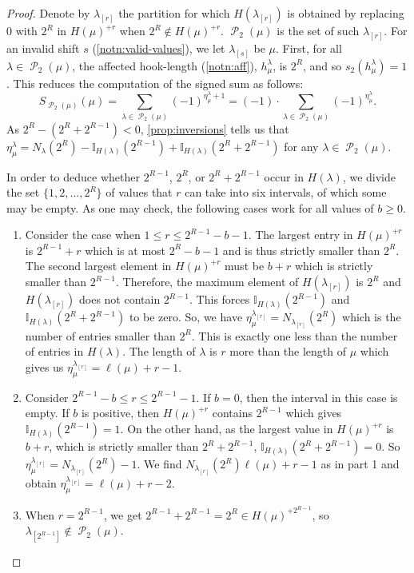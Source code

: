 \documentclass[10pt,a4paper]{amsart}
\newcommand{\la}{\lambda}
\DeclareMathOperator{\p}{\mathcal{P}}
\begin{document}
\begin{proof}
Denote by $\lambda_{[r]}$ the partition for which $H(\la_{[r]})$ is obtained by replacing 0 with $2^R$ in $ H(\mu)^{+r}$ when $2^R\not\in H(\mu)^{+r}$. $\p_2(\mu)$ is the set of such $\la_{[r]}$. For an invalid shift $s$ (\cref{notn:valid-values}), we let $\la_{[s]}$ be $\mu$. First, for all $\lambda\in\p_2(\mu)$, the affected hook-length (\cref{notn:aff}), $h^\lambda_\mu$, is  $2^R$, and so $s_2(h^\lambda_\mu) = 1$. This reduces the computation of the signed sum as follows:
\[
S_{\p_2(\mu)}({\mu}) = \sum\limits_{\lambda\in \p_2(\mu)} (-1)^{\eta^\lambda_\mu + 1} = (-1)\cdot\sum\limits_{\lambda\in \p_2(\mu)} (-1)^{\eta^\lambda_\mu}.
\]
As $2^R - (2^R+ 2^{R-1}) < 0$,   \cref{prop:inversions} tells us that $
\eta^\lambda_\mu = N_{\lambda}(2^R) - \mathbb{I}_{H(\lambda)}(2^{R-1}) + \mathbb{I}_{H(\lambda)}(2^R +2^{R-1})$ for any $\la\in \p_2(\mu)$.

In order to deduce whether $2^{R-1}$, $2^R$, or $2^{R}+2^{R-1}$ occur in $H(\la)$, we divide the set $\{1,2,\ldots, 2^R\}$ of values that $r$ can take into six intervals, of which some may be empty. As one may check, the following cases work for all values of $b\geq 0$.
\begin{enumerate}
\item Consider the case when {$1 \leq r\leq 2^{R-1} - b - 1$}. The largest entry in $H(\mu)^{+r}$ is $2^{R-1} + r$ which is at most $ 2^{R} - b -1$ and is thus strictly smaller than $2^R$. The second largest element in $H(\mu)^{+r}$ must be $b+r$ which is strictly smaller than $2^{R-1}$. Therefore, the maximum element of $H(\la_{[r]})$ is $2^R$ and $H(\la_{[r]})$ does not contain $2^{R-1}$. This forces $\mathbb{I}_{H(\lambda)}(2^{R-1})$ and $ \mathbb{I}_{H(\lambda)}(2^R +2^{R-1})$ to be zero. So, we have $\eta^{\lambda_{[r]}}_\mu = N_{\lambda_{[r]}}(2^R)$ which is the number of entries smaller than $2^R$. This is exactly one less than the number of entries in $H(\la)$. The length of $\la$ is $r$ more than the length of $\mu$ which gives us $\eta^{\lambda_{[r]}}_\mu = \ell(\mu) + r - 1$.

\item Consider {$2^{R-1} - b \leq r \leq 2^{R-1}-1$}. If $b = 0$, then the interval in this case is empty. If $b$ is positive, then $H(\mu)^{+r}$ contains $2^{R-1}$ which gives $\mathbb{I}_{H(\lambda)}(2^{R-1})=1$. On the other hand, as the largest value in $H(\mu)^{+r}$ is $b+r$, which is strictly smaller than $2^R + 2^{R-1}$, $\mathbb{I}_{H(\lambda)}(2^R + 2^{R-1})=0$. So $\eta^{\lambda_{[r]}}_\mu = N_{\lambda_{[r]}}(2^R) - 1$. We find $N_{\lambda_{[r]}}(2^R) \ell(\mu) + r-1$ as in part 1 and obtain $\eta^{\lambda_{[r]}}_\mu = \ell(\mu) + r - 2$.
\item When $r = 2^{R-1}$, we get $2^{R-1} + 2^{R-1} = 2^R\in H(\mu)^{+2^{R-1}}$, so $\lambda_{[2^{R-1}]} \not\in \p_2(\mu)$.


\end{enumerate}
\end{proof}
\end{document}
